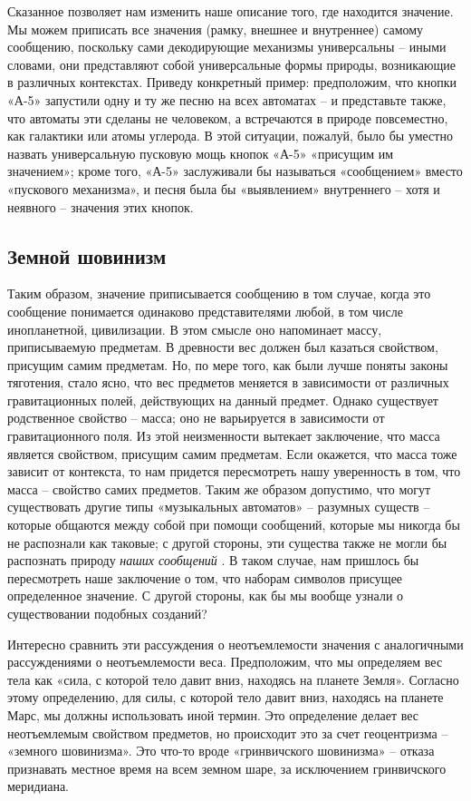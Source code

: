 \documentclass[../main.tex]{subfiles}
\begin{document}
Сказанное позволяет нам изменить наше описание того, где находится значение. Мы можем приписать все значения (рамку, внешнее и внутреннее) самому сообщению, поскольку сами декодирующие механизмы универсальны \--- иными словами, они представляют собой универсальные формы природы, возникающие в различных контекстах. Приведу конкретный пример: предположим, что кнопки «А-5» запустили одну и ту же песню на всех автоматах \--- и представьте также, что автоматы эти сделаны не человеком, а встречаются в природе повсеместно, как галактики или атомы углерода. В этой ситуации, пожалуй, было бы уместно назвать универсальную пусковую мощь кнопок «А-5» «присущим им значением»; кроме того, «А-5» заслуживали бы называться «сообщением» вместо «пускового механизма», и песня была бы «выявлением» внутреннего \--- хотя и неявного \--- значения этих кнопок.


\subsection{Земной шовинизм}

Таким образом, значение приписывается сообщению в том случае, когда это сообщение понимается одинаково представителями любой, в том числе инопланетной, цивилизации. В этом смысле оно напоминает массу, приписываемую предметам. В древности вес должен был казаться свойством, присущим самим предметам. Но, по мере того, как были лучше поняты законы тяготения, стало ясно, что вес предметов меняется в зависимости от различных гравитационных полей, действующих на данный предмет. Однако существует родственное свойство \--- масса; оно не варьируется в зависимости от гравитационного поля. Из этой неизменности вытекает заключение, что масса является свойством, присущим самим предметам. Если окажется, что масса тоже зависит от контекста, то нам придется пересмотреть нашу уверенность в том, что масса \--- свойство самих предметов. Таким же образом допустимо, что могут существовать другие типы «музыкальных автоматов» \--- разумных существ \--- которые общаются между собой при помощи сообщений, которые мы никогда бы не распознали как таковые; с другой стороны, эти существа также не могли бы распознать природу \emph{наших сообщений} . В таком случае, нам пришлось бы пересмотреть наше заключение о том, что наборам символов присущее определенное значение. С другой стороны, как бы мы вообще узнали о существовании подобных созданий?

Интересно сравнить эти рассуждения о неотъемлемости значения с аналогичными рассуждениями о неотъемлемости веса. Предположим, что мы определяем вес тела как «сила, с которой тело давит вниз, находясь на планете Земля». Согласно этому определению, для силы, с которой тело давит вниз, находясь на планете Марс, мы должны использовать иной термин. Это определение делает вес неотъемлемым свойством предметов, но происходит это за счет геоцентризма \--- «земного шовинизма». Это что-то вроде «гринвичского шовинизма» \--- отказа признавать местное время на всем земном шаре, за исключением гринвичского меридиана.
\end{document}
